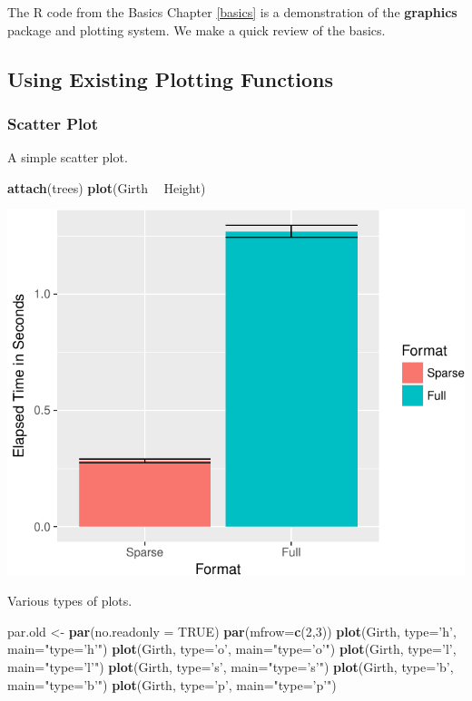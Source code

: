 \documentclass[]{book}
\newenvironment{Shaded}{\begin{snugshade}}{\end{snugshade}}
\newcommand{\KeywordTok}[1]{\textcolor[rgb]{0.13,0.29,0.53}{\textbf{#1}}}
\newcommand{\DataTypeTok}[1]{\textcolor[rgb]{0.13,0.29,0.53}{#1}}
\newcommand{\DecValTok}[1]{\textcolor[rgb]{0.00,0.00,0.81}{#1}}
\newcommand{\StringTok}[1]{\textcolor[rgb]{0.31,0.60,0.02}{#1}}
\newcommand{\OtherTok}[1]{\textcolor[rgb]{0.56,0.35,0.01}{#1}}
\newcommand{\OperatorTok}[1]{\textcolor[rgb]{0.81,0.36,0.00}{\textbf{#1}}}
\newcommand{\NormalTok}[1]{#1}
\theoremstyle{definition}
\theoremstyle{definition}
\theoremstyle{definition}
\theoremstyle{remark}
\begin{document}
The R code from the Basics Chapter \ref{basics} is a demonstration of
the \textbf{graphics} package and plotting system. We make a quick
review of the basics.

\subsection{Using Existing Plotting
Functions}\label{using-existing-plotting-functions}

\subsubsection{Scatter Plot}\label{scatter-plot}

A simple scatter plot.

\begin{Shaded}
\begin{Highlighting}[]
\KeywordTok{attach}\NormalTok{(trees)}
\KeywordTok{plot}\NormalTok{(Girth }\OperatorTok{~}\StringTok{ }\NormalTok{Height)}
\end{Highlighting}
\end{Shaded}

\includegraphics[width=0.5\linewidth]{Rcourse_files/figure-latex/unnamed-chunk-262-1}

Various types of plots.

\begin{Shaded}
\begin{Highlighting}[]
\NormalTok{par.old <-}\StringTok{ }\KeywordTok{par}\NormalTok{(}\DataTypeTok{no.readonly =} \OtherTok{TRUE}\NormalTok{)}
\KeywordTok{par}\NormalTok{(}\DataTypeTok{mfrow=}\KeywordTok{c}\NormalTok{(}\DecValTok{2}\NormalTok{,}\DecValTok{3}\NormalTok{))}
\KeywordTok{plot}\NormalTok{(Girth, }\DataTypeTok{type=}\StringTok{'h'}\NormalTok{, }\DataTypeTok{main=}\StringTok{"type='h'"}\NormalTok{) }
\KeywordTok{plot}\NormalTok{(Girth, }\DataTypeTok{type=}\StringTok{'o'}\NormalTok{, }\DataTypeTok{main=}\StringTok{"type='o'"}\NormalTok{) }
\KeywordTok{plot}\NormalTok{(Girth, }\DataTypeTok{type=}\StringTok{'l'}\NormalTok{, }\DataTypeTok{main=}\StringTok{"type='l'"}\NormalTok{)}
\KeywordTok{plot}\NormalTok{(Girth, }\DataTypeTok{type=}\StringTok{'s'}\NormalTok{, }\DataTypeTok{main=}\StringTok{"type='s'"}\NormalTok{)}
\KeywordTok{plot}\NormalTok{(Girth, }\DataTypeTok{type=}\StringTok{'b'}\NormalTok{, }\DataTypeTok{main=}\StringTok{"type='b'"}\NormalTok{)}
\KeywordTok{plot}\NormalTok{(Girth, }\DataTypeTok{type=}\StringTok{'p'}\NormalTok{, }\DataTypeTok{main=}\StringTok{"type='p'"}\NormalTok{)}
\end{Highlighting}
\end{Shaded}
\end{document}

